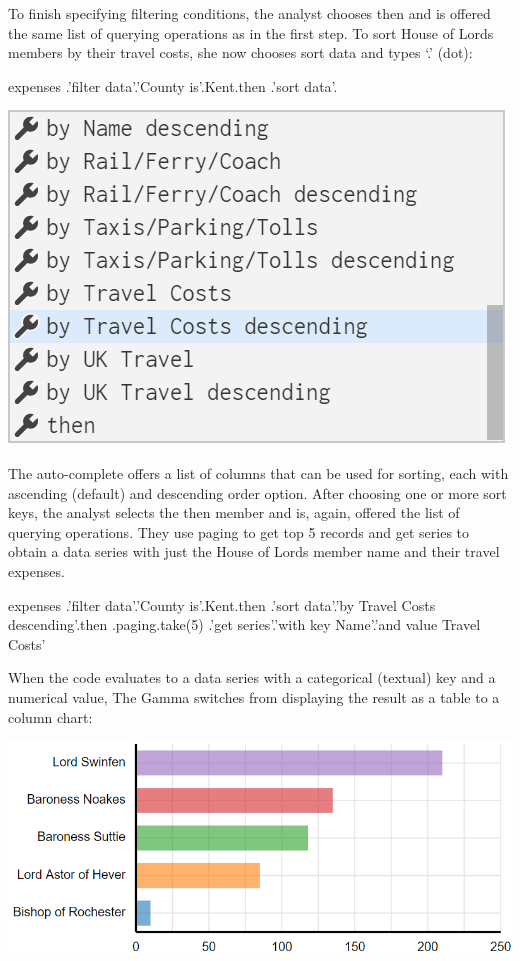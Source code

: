 \documentclass{sigchi}
\newcommand{\ikvd}[1]{{\fontfamily{zi4}\selectfont\small #1}}
\newcommand{\tg}{The Gamma\xspace}
\begin{document}
To finish specifying filtering conditions, the analyst chooses \ikvd{then} and is offered the
same list of querying operations as in the first step. To sort House of Lords members by their
travel costs, she now chooses \ikvd{sort data} and types `.' (dot):

\begin{thegamma}
expenses
  .'filter data'.'County is'.Kent.then
  .'sort data'.
\end{thegamma}
\qquad\includegraphics[width=0.5\columnwidth]{figures/lords4}

The auto-complete offers a list of columns that can be used for sorting, each with ascending
(default) and descending order option. After choosing one or more sort keys, the analyst selects
the \ikvd{then} member and is, again, offered the list of querying operations. They use
\ikvd{paging} to get top 5 records and \ikvd{get series} to obtain a data series with just
the House of Lords member name and their travel expenses.

\begin{thegamma}
expenses
  .'filter data'.'County is'.Kent.then
  .'sort data'.'by Travel Costs descending'.then
  .paging.take(5)
  .'get series'.'with key Name'.'and value Travel Costs'
\end{thegamma}

When the code evaluates to a data series with a categorical (textual) key and a numerical value,
\tg switches from displaying the result as a table to a column chart:

\includegraphics[width=1\columnwidth]{figures/lords5}
\vspace{-1.5em}
\end{document}

